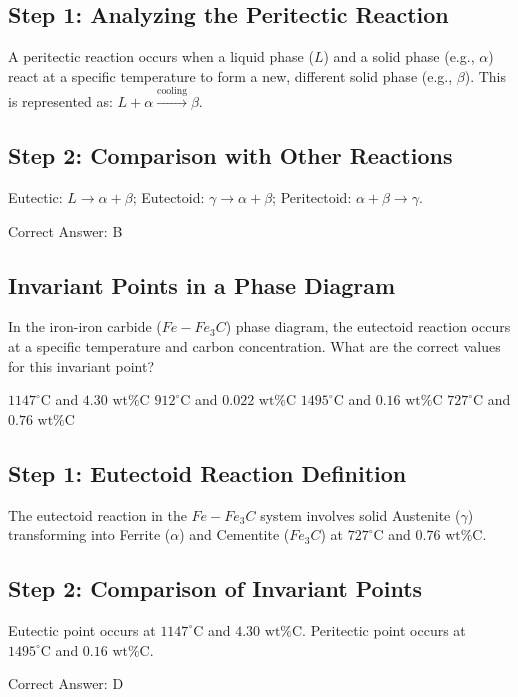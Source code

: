 \begin{solution}

\subsection*{Step 1: Analyzing the Peritectic Reaction}
A peritectic reaction occurs when a liquid phase ($L$) and a solid phase (e.g., $\alpha$) react at a specific temperature to form a new, different solid phase (e.g., $\beta$). This is represented as: $L + \alpha \xrightarrow{\text{cooling}} \beta$.

\subsection*{Step 2: Comparison with Other Reactions}
Eutectic: $L \rightarrow \alpha + \beta$; Eutectoid: $\gamma \rightarrow \alpha + \beta$; Peritectoid: $\alpha + \beta \rightarrow \gamma$.

Correct Answer: B
\end{solution}

\clearpage

\subsection{Invariant Points in a Phase Diagram}

In the iron-iron carbide ($Fe - Fe_3C$) phase diagram, the eutectoid reaction occurs at a specific temperature and carbon concentration. What are the correct values for this invariant point?

\begin{choices}
    \choice $1147^\circ\text{C}$ and $4.30 \text{ wt\% C}$
    \choice $912^\circ\text{C}$ and $0.022 \text{ wt\% C}$
    \choice $1495^\circ\text{C}$ and $0.16 \text{ wt\% C}$
    \correctchoice $727^\circ\text{C}$ and $0.76 \text{ wt\% C}$
\end{choices}

\begin{solution}

\subsection*{Step 1: Eutectoid Reaction Definition}
The eutectoid reaction in the $Fe-Fe_3C$ system involves solid Austenite ($\gamma$) transforming into Ferrite ($\alpha$) and Cementite ($Fe_3C$) at $727^\circ\text{C}$ and $0.76 \text{ wt\% C}$.

\subsection*{Step 2: Comparison of Invariant Points}
Eutectic point occurs at $1147^\circ\text{C}$ and $4.30 \text{ wt\% C}$. Peritectic point occurs at $1495^\circ\text{C}$ and $0.16 \text{ wt\% C}$.

Correct Answer: D
\end{solution}

